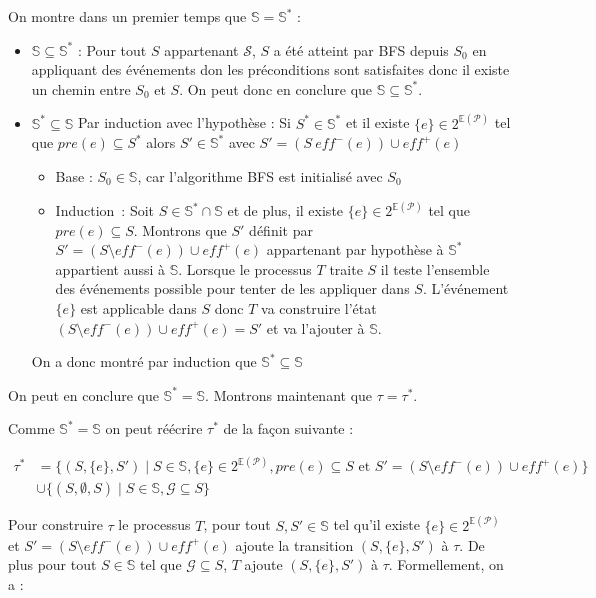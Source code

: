 On montre dans un premier temps que $\mathds{S} = \mathds{S}^*$ :
\begin{itemize}
    \item $\mathds{S} \subseteq \mathds{S}^*$ : Pour tout $S$ appartenant $\mathcal{S}$, $S$ a été atteint par BFS depuis $S_0$ en appliquant des événements don les préconditions sont satisfaites donc il existe un chemin entre $S_0$ et $S$. On peut donc en conclure que $\mathds{S} \subseteq \mathds{S}^*$.
    \item $\mathds{S}^* \subseteq \mathds{S}$ Par induction avec l'hypothèse : Si $S^* \in \mathds{S}^*$ et il existe $\{e\}\in 2^{\mathds{E}(\mathcal{P})}$ tel que $pre(e) \subseteq S^*$ alors $S'\in \mathds{S}^*$ avec $S' = (S \ eff^-(e)) \cup eff^+(e)$
    \begin{itemize}
        \item Base : $S_0 \in \mathds{S}$, car l'algorithme BFS est initialisé avec $S_0$
        \item  Induction : Soit $S \in \mathds{S}^* \cap \mathds{S}$  et de plus, il existe $\{e\} \in 2^{\mathds{E}(\mathcal{P})}$ tel que $pre(e) \subseteq S$. Montrons que $S'$ définit par  $S' = (S \setminus eff^-(e)) \cup eff^+(e)$ appartenant par hypothèse à $\mathds{S}^*$ appartient aussi à $\mathds{S}$. Lorsque le processus $T$ traite $S$ il teste l'ensemble des événements possible pour tenter de les appliquer dans $S$. L'événement  $\{e\}$ est applicable dans $S$ donc $T$ va construire l'état $(S \setminus eff^-(e)) \cup eff^+(e) = S'$ et va l'ajouter à $\mathds{S}$.
    \end{itemize}
    On a donc montré par induction que $\mathds{S}^* \subseteq \mathds{S}$
\end{itemize}
On peut en conclure que $\mathds{S}^* = \mathds{S}$. Montrons maintenant que $\tau = \tau^*$.

Comme $\mathds{S}^* = \mathds{S}$ on peut réécrire $\tau^*$ de la façon suivante :


\begin{equation*}
    \begin{aligned}
    \tau^* &= \{(S, \{e\}, S') \mid S \in \mathbb{S}, \{e\} \in 2^{\mathds{E}(\mathcal{P})}, pre(e) \subseteq S \text{ et } S' = (S \setminus eff^-(e)) \cup eff^+(e)\} \\
    &\cup \{(S, \emptyset, S) \mid S \in \mathds{S}, \mathcal{G} \subseteq S\}
    \end{aligned}
\end{equation*}


Pour construire $\tau$ le processus $T$, pour tout $S,S'\in \mathds{S}$ tel qu'il existe $\{e\} \in 2^{\mathds{E}(\mathcal{P})}$ et $S' = (S \setminus eff^-(e)) \cup eff^+(e)$ ajoute la transition $(S,\{e\}, S')$ à $\tau$. De plus pour tout $S\in \mathds{S}$ tel que $\mathcal{G} \subseteq S$, $T$ ajoute $(S,\{e\}, S')$ à $\tau$. Formellement, on a :

